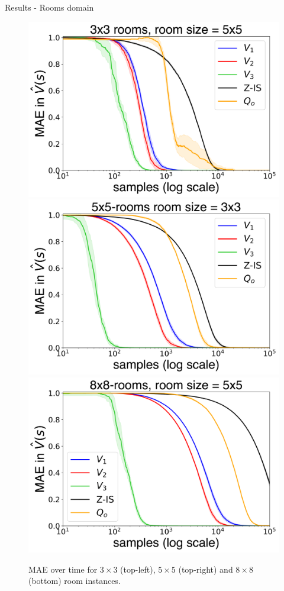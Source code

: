 \documentclass{beamer}
\theoremstyle{mystyle}
\begin{document}
\begin{frame}{Results - Rooms domain}

    \begin{figure}[H]
    \centering
    \includegraphics[scale=0.2]{Figures/nroom_3_3-1.png}
    \includegraphics[scale=0.2]{Figures/nroom_5_5-1.png}
    \includegraphics[scale=0.2]{Figures/nroom_8_8-1.png}
    
    \caption{MAE over time for $3 \times 3$ (top-left), $5 \times 5$ (top-right) and $8 \times 8$ (bottom) room instances.}
    \label{fig:errors_grid}
    \end{figure}
    
    \end{frame}
\end{document}
